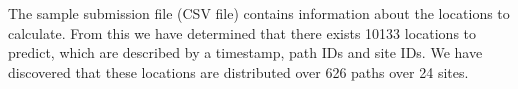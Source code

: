 The sample submission file (CSV file) contains information about the locations to calculate. From this we have determined that there exists 10133 locations to predict, which are described by a timestamp, path IDs and site IDs. We have discovered that these locations are distributed over 626 paths over 24 sites.

